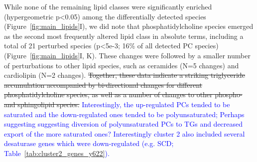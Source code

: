 While none of the remaining lipid classes were significantly enriched (hypergeometric p<0.05) among the differentially detected species (Figure~\ref{fig:main_lipids}I), we did note that phosphatidylcholine species emerged as the second most frequently altered lipid class in absolute terms, including a total of 21 perturbed species (p<5e-3; 16\% of all detected PC species)(Figure~\ref{fig:main_lipids}I, K). These changes were followed by a smaller number of perturbations to other lipid species, such as ceramides (N=5 changes) and cardiolipin (N=2 changes). \sout{Together, these data indicate a striking triglyceride accumulation accompanied by bi-directional changes for different phosphatidylcholine species, as well as a number of changes to other phospho- and sphingolipid species.} \textcolor{blue}{Interestingly, the up-regulated PCs tended to be saturated and the down-regulated ones tended to be polyunsaturated; Perhaps suggesting suggesting diversion of polyunsaturated PCs to TGs and decreased export of the more saturated ones? Interestingly cluster 2 also included several desaturase genes which were down-regulated (e.g. SCD; Table~\ref{tab:cluster2_genes_y622}).}


